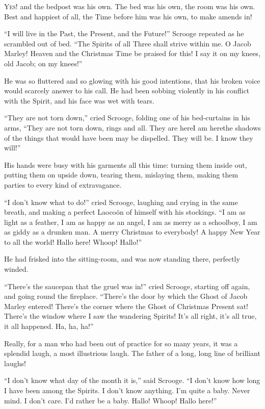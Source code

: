 \documentclass[paper=5.5in:8.5in,BCOR=7mm,twoside,DIV=calc,12pt,usegeometry]{scrbook} %
\begin{document}
\lettrine[loversize=.85]{Y}{es!} and the bedpost was his own. The bed was his own, the room was his own. Best and happiest of all, the Time before him was his own, to make amends in!

\enquote{I will live in the Past, the Present, and the Future!} Scrooge repeated as he scrambled out of bed. \enquote{The Spirits of all Three shall strive within me. O Jacob Marley! Heaven and the Christmas Time be praised for this! I say it on my knees, old Jacob; on my knees!}

He was so fluttered and so glowing with his good intentions, that his broken voice would scarcely answer to his call. He had been sobbing violently in his conflict with the Spirit, and his face was wet with tears.

\enquote{They are not torn down,} cried Scrooge, folding one of his bed-curtains in his arms, \enquote{They are not torn down, rings and all. They are here\textemdash I am here\textemdash the shadows of the things that would have been may be dispelled. They will be. I know they will!}

His hands were busy with his garments all this time: turning them inside out, putting them on upside down, tearing them, mislaying them, making them parties to every kind of extravagance.

\enquote{I don't know what to do!} cried Scrooge, laughing and crying in the same breath, and making a perfect Laoco\"on of himself with his stockings. \enquote{I am as light as a feather, I am as happy as an angel, I am as merry as a schoolboy, I am as giddy as a drunken man. A merry Christmas to everybody! A happy New Year to all the world! Hallo here! Whoop! Hallo!}

He had frisked into the sitting-room, and was now standing there, perfectly winded.

\enquote{There's the saucepan that the gruel was in!} cried Scrooge, starting off again, and going round the fireplace. \enquote{There's the door by which the Ghost of Jacob Marley entered! There's the corner where the Ghost of Christmas Present sat! There's the window where I saw the wandering Spirits! It's all right, it's all true, it all happened. Ha, ha, ha!}

Really, for a man who had been out of practice for so many years, it was a splendid laugh, a most illustrious laugh. The father of a long, long line of brilliant laughs!

\enquote{I don't know what day of the month it is,} said Scrooge. \enquote{I don't know how long I have been among the Spirits. I don't know anything. I'm quite a baby. Never mind. I don't care. I'd rather be a baby. Hallo! Whoop! Hallo here!}
\end{document}
